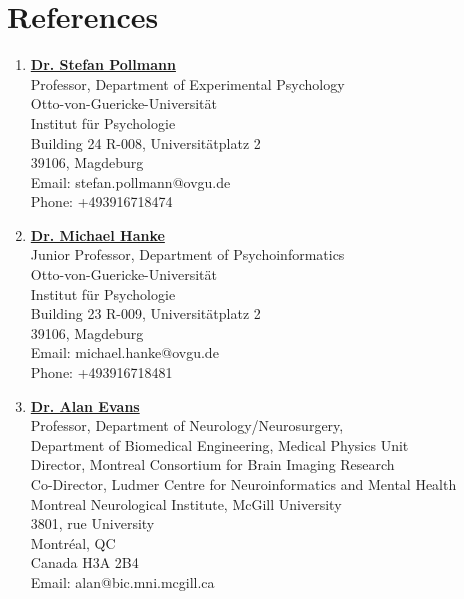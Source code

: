 \documentclass[line, margin]{res}
\begin{document}
\begin{resume}
\begin{itemize}
\end{itemize}




\section{References}
\begin{enumerate}
    \item []\href{http://www.ipsy.ovgu.de/ipsy/en/Departments/Experimental+Psychology/People.html}{\textbf{Dr. Stefan Pollmann}}\\Professor, Department of Experimental Psychology\\Otto-von-Guericke-Universit\"{a}t\\Institut f\"{u}r Psychologie\\Building 24 R-008, Universit\"{a}tplatz 2\\39106, Magdeburg\\Email: stefan.pollmann@ovgu.de\\Phone: +493916718474

    \item []\href{http://mih.voxindeserto.de/}{\textbf{Dr. Michael Hanke}}\\Junior Professor, Department of Psychoinformatics\\Otto-von-Guericke-Universit\"{a}t\\Institut f\"{u}r Psychologie\\Building 23 R-009, Universit\"{a}tplatz 2\\39106, Magdeburg\\Email: michael.hanke@ovgu.de\\Phone: +493916718481

    \item []\href{http://mcin-cnim.ca/people/alans-cv/}{\textbf{Dr. Alan Evans}}\\Professor, Department of Neurology/Neurosurgery,\\Department of Biomedical Engineering, Medical Physics Unit\\Director, Montreal Consortium for Brain Imaging Research\\Co-Director, Ludmer Centre for Neuroinformatics and Mental Health\\Montreal Neurological Institute, McGill University\\3801, rue University\\Montréal, QC\\Canada H3A 2B4\\Email: alan@bic.mni.mcgill.ca
\end{enumerate}

\end{resume}
\end{document}
